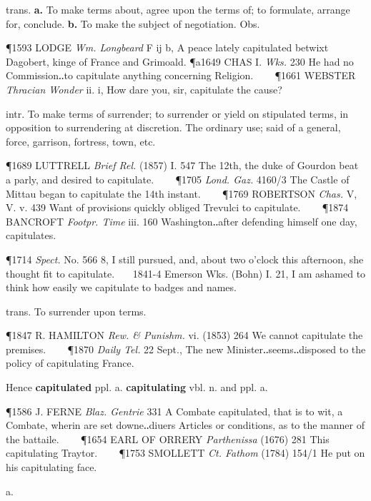 \begin{description}[wide, labelwidth=!, labelindent=0pt]
\begin{myenumerate}
 trans. \textbf{a.} To make terms about, agree upon the terms of; to
formulate, arrange for, conclude. \textbf{b.} To make the subject of negotiation. Obs.

\P 1593 LODGE  \textit{Wm. Longbeard} F ij b, A peace lately capitulated betwixt Dagobert, kinge of France and Grimoald.
\P a1649 CHAS I. \textit{Wks.} 230 He had no Commission‥to capitulate anything concerning Religion.    
\P 1661 WEBSTER  \textit{Thracian Wonder} ii. i, How dare you, sir, capitulate the cause?

 intr. To make terms of surrender; to surrender or yield on stipulated terms, in opposition to surrendering at discretion. The ordinary use; said of a general, force, garrison, fortress, town, etc.

\P 1689 LUTTRELL  \textit{Brief Rel.} (1857) I. 547 The 12th, the duke of Gourdon beat a parly, and desired to capitulate.    
\P 1705 \textit{Lond.  Gaz.} 4160/3 The Castle of Mittau began to capitulate the 14th instant.    
\P 1769 ROBERTSON  \textit{Chas.} V, V. v. 439 Want of provisions quickly obliged Trevulci to capitulate.    
\P 1874 BANCROFT  \textit{Footpr. Time} iii. 160 Washington‥after defending himself one day, capitulates.

\P 1714  \textit{Spect.} No. 566 8, I still pursued, and, about two o'clock this afternoon, she thought fit to capitulate.    1841-4 Emerson Wks. (Bohn) I. 21, I am ashamed to think how easily we capitulate to badges and names.

 trans. To surrender upon terms.

\P 1847 R. HAMILTON  \textit{Rew. \& Punishm.} vi. (1853) 264 We cannot capitulate the premises.    
\P 1870  \textit{Daily Tel.} 22 Sept., The new Minister‥seems‥disposed to the policy of capitulating France.

\vspace{0.1cm} \noindent
Hence \textbf{capitulated} ppl. a. \textbf{capitulating} vbl. n. and ppl. a.

\P 1586 J. FERNE  \textit{Blaz. Gentrie} 331 A Combate capitulated, that is to wit, a Combate, wherin are set downe‥diuers Articles or conditions, as to the manner of the battaile.    
\P 1654 EARL  OF ORRERY \textit{Parthenissa} (1676) 281 This capitulating Traytor.    
\P 1753 SMOLLETT  \textit{Ct. Fathom} (1784) 154/1 He put on his capitulating face.
\end{myenumerate}


 a.


\end{description}
